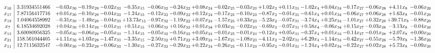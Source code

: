 \documentclass[9pt]{article}
\begin{document}
 \[\begin{array}{c| c c@{\hskip 2pt} c@{\hskip 2pt} c@{\hskip 2pt} c@{\hskip 2pt} c@{\hskip 2pt} c@{\hskip 2pt} c@{\hskip 2pt} c@{\hskip 2pt} c@{\hskip 2pt} c@{\hskip 2pt} c@{\hskip 2pt} c@{\hskip 2pt} c@{\hskip 2pt} c@{\hskip 2pt} c@{\hskip 2pt} c@{\hskip 2pt} c@{\hskip 2pt} }
 x_{10}   &  3.31934551466 & -0.03 x_{30} & -0.19 x_{29} & -0.02 x_{33} & -0.35 x_{15} & -0.06 x_{32} & -0.24 x_{22} & +  0.08 x_{24} & -0.02 x_{25} & -0.03 x_{23} & +  1.02 x_{2} & +  0.11 x_{31} & -1.02 x_{4} & +  0.04 x_{34} & -0.17 x_{27} & -0.06 x_{28} & +  4.11 x_{8} & -0.06 x_{20}\\
 x_{17}   &  7.87156417716 & +  0.01 x_{30} & -0.10 x_{29} & -0.04 x_{33} & -1.24 x_{15} & -0.12 x_{32} & -0.09 x_{22} & +  0.12 x_{24} & -0.17 x_{25} & -0.10 x_{23} & -0.87 x_{2} & -0.01 x_{31} & -0.61 x_{4} & +  0.01 x_{34} & -0.06 x_{27} & +  0.06 x_{28} & +  1.63 x_{8} & -0.01 x_{20}\\
 x_{19}   &  1.04064558992 & -0.31 x_{30} & -1.49 x_{29} & -0.04 x_{33} & + 13.73 x_{15} & -0.97 x_{32} & -1.19 x_{22} & +  0.07 x_{24} & -1.57 x_{25} & +  0.33 x_{23} & -5.23 x_{2} & -0.07 x_{31} & -3.74 x_{4} & +  0.25 x_{34} & -1.01 x_{27} & +  0.32 x_{28} & + 39.71 x_{8} & -0.88 x_{20}\\
 x_{7}   &  6.18534692028 & +  0.04 x_{30} & +  0.14 x_{29} & -0.01 x_{33} & +  0.51 x_{15} & +  0.06 x_{32} & +  0.16 x_{22} & +  0.01 x_{24} & +  0.03 x_{25} & -0.02 x_{23} & -0.69 x_{2} & -0.07 x_{31} & +  0.58 x_{4} & -0.06 x_{34} & +  0.15 x_{27} & -0.03 x_{28} & -3.13 x_{8} & -0.04 x_{20}\\
 x_{13}   &  3.60080956325 & -0.05 x_{30} & -0.06 x_{29} & -0.05 x_{33} & -1.14 x_{15} & -0.05 x_{32} & -0.16 x_{22} & +  0.05 x_{24} & -0.01 x_{25} & -0.01 x_{23} & -0.12 x_{2} & +  0.05 x_{31} & -0.37 x_{4} & +  0.01 x_{34} & -0.14 x_{27} & -0.01 x_{28} & +  2.07 x_{8} & +  0.00 x_{20}\\
 x_{21}   &  158.561044405 & +  1.11 x_{30} & +  1.03 x_{29} & -1.47 x_{33} & -3.35 x_{15} & -2.50 x_{32} & +  0.71 x_{22} & +  3.09 x_{24} & -1.67 x_{25} & -1.08 x_{23} & -4.11 x_{2} & -2.02 x_{31} & +  6.29 x_{4} & -1.14 x_{34} & -0.42 x_{27} & -0.55 x_{28} & -5.70 x_{8} & -1.36 x_{20}\\
 x_{11}   &  12.7115632547 & -0.00 x_{30} & -0.23 x_{29} & -0.06 x_{33} & -1.30 x_{15} & -0.27 x_{32} & -0.29 x_{22} & +  0.22 x_{24} & -0.26 x_{25} & -0.11 x_{23} & -0.95 x_{2} & -0.01 x_{31} & -1.24 x_{4} & +  0.02 x_{34} & -0.22 x_{27} & +  0.02 x_{28} & +  5.73 x_{8} & -0.09 x_{20}\\

\end{array}\]
\end{document}
